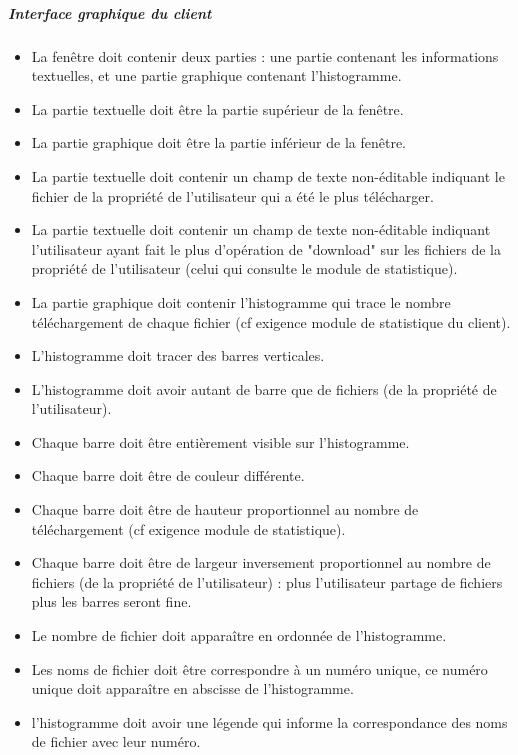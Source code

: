 \documentclass[10pt,a4paper]{report}
\begin{document}
\subparagraph{\textbf{Interface graphique du client }}
\begin{itemize}[label = $\triangleright$]

\item La fenêtre doit contenir deux parties : une partie contenant les informations textuelles, et une partie graphique contenant l'histogramme.

\item La partie textuelle doit être la partie supérieur de la fenêtre.

\item La partie graphique doit être la partie inférieur de la fenêtre.

\item La partie textuelle doit contenir un champ de texte non-éditable indiquant le fichier de la propriété de l'utilisateur qui a été le plus télécharger.

\item La partie textuelle doit contenir un champ de texte non-éditable indiquant l'utilisateur ayant fait le plus d'opération de "download" sur les fichiers de la propriété de l'utilisateur (celui qui consulte le module de statistique).

\item La partie graphique doit contenir l'histogramme qui trace le nombre téléchargement de chaque fichier (cf exigence module de statistique du client).

\item L'histogramme doit tracer des barres verticales.

\item L'histogramme doit avoir autant de barre que de fichiers (de la propriété de l'utilisateur).

\item Chaque barre doit être entièrement visible sur l'histogramme.

\item Chaque barre doit être de couleur différente.

\item Chaque barre doit être de hauteur proportionnel au nombre de téléchargement (cf exigence module de statistique).

\item Chaque barre doit être de largeur inversement proportionnel au nombre de fichiers (de la propriété de l'utilisateur) : plus l'utilisateur partage de fichiers plus les barres seront fine.

\item Le nombre de fichier doit apparaître en ordonnée de l'histogramme.

\item Les noms de fichier doit être correspondre à un numéro unique, ce numéro unique doit apparaître en abscisse de l'histogramme.

\item l'histogramme doit avoir une légende qui informe la correspondance des noms de fichier avec leur numéro.
\end{itemize}
\end{document}
